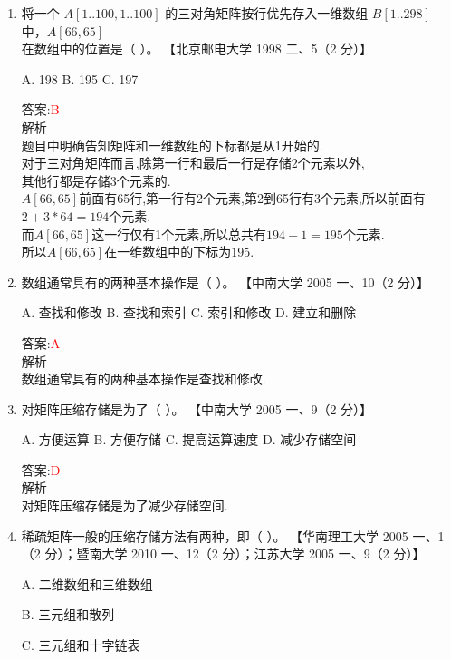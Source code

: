 \documentclass[lang=cn,newtx,10pt,scheme=chinese]{../elegantbook}
\begin{document}
\begin{enumerate}
    \item 将一个 $A[1..100, 1..100]$ 的三对角矩阵按行优先存入一维数组 $B[1..298]$ 中，$A[66,65]$ 在数组中的位置是（ ）。  
    【北京邮电大学 1998 二、5（2 分）】  

    A. 198 \quad B. 195 \quad C. 197  

    答案:\textcolor{red}{B}\\
    解析\\
    题目中明确告知矩阵和一维数组的下标都是从1开始的.\\
    对于三对角矩阵而言,除第一行和最后一行是存储2个元素以外,\\
    其他行都是存储3个元素的.\\
    $A[66,65]$前面有65行,第一行有2个元素,第2到65行有3个元素,所以前面有$2+3*64=194$个元素.\\
    而$A[66,65]$这一行仅有1个元素,所以总共有$194+1=195$个元素.\\
    所以$A[66,65]$在一维数组中的下标为$195$.\\
    
    

    \item 数组通常具有的两种基本操作是（ ）。  
    【中南大学 2005 一、10（2 分）】  

    A. 查找和修改 \quad B. 查找和索引 \quad C. 索引和修改 \quad D. 建立和删除  

    答案:\textcolor{red}{A}\\
    解析\\
    数组通常具有的两种基本操作是查找和修改.\\
    

    \item 对矩阵压缩存储是为了（ ）。  
    【中南大学 2005 一、9（2 分）】  

    A. 方便运算 \quad B. 方便存储 \quad C. 提高运算速度 \quad D. 减少存储空间  

    答案:\textcolor{red}{D}\\
    解析\\
    对矩阵压缩存储是为了减少存储空间.\\

    \item 稀疏矩阵一般的压缩存储方法有两种，即（ ）。  
    【华南理工大学 2005 一、1（2 分）；暨南大学 2010 一、12（2 分）；江苏大学 2005 一、9（2 分）】  

    A. 二维数组和三维数组  

    B. 三元组和散列  

    C. 三元组和十字链表  


\end{enumerate}
\end{document}
